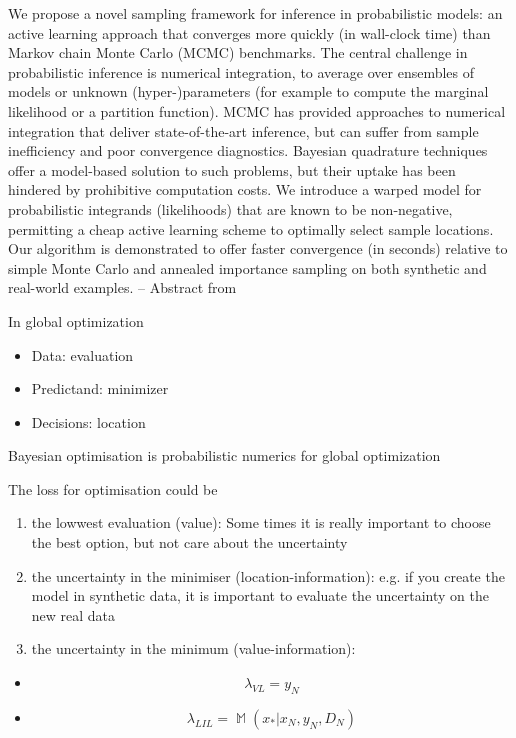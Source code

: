\begin{mybox}
  We propose a novel sampling framework for inference in probabilistic models: an
active learning approach that converges more quickly (in wall-clock time) than
Markov chain Monte Carlo (MCMC) benchmarks. The central challenge in probabilistic
inference is numerical integration, to average over ensembles of models or
unknown (hyper-)parameters (for example to compute the marginal likelihood or
a partition function). MCMC has provided approaches to numerical integration that
deliver state-of-the-art inference, but can suffer from sample inefficiency and poor
convergence diagnostics. Bayesian quadrature techniques offer a model-based
solution to such problems, but their uptake has been hindered by prohibitive computation
costs. We introduce a warped model for probabilistic integrands (likelihoods)
that are known to be non-negative, permitting a cheap active learning
scheme to optimally select sample locations. Our algorithm is demonstrated to
offer faster convergence (in seconds) relative to simple Monte Carlo and annealed
importance sampling on both synthetic and real-world examples. -- Abstract from
\cite{gunter2014sampling}
\end{mybox}

In global optimization

\begin{itemize}
  \item Data: evaluation
  \item Predictand: minimizer
  \item Decisions: location
\end{itemize}

Bayesian optimisation is probabilistic numerics for global optimization

The loss for optimisation could be

\begin{enumerate}
  \item the lowwest evaluation (value): Some times it is really important to
    choose the best option, but not care about the uncertainty
  \item the uncertainty in the minimiser (location-information): e.g. if you
    create the model in synthetic data, it is important to evaluate the
    uncertainty on the new real data
  \item the uncertainty in the minimum (value-information):
\end{enumerate}


\begin{itemize}
    \item
    \begin{equation}
      \lambda_{VL} = y_N
    \end{equation}
    \item
    \begin{equation}
      \lambda_{LIL} = \mathbb{\mathop{M}} (x_* | x_N, y_N, D_N)
    \end{equation}
\end{itemize}

